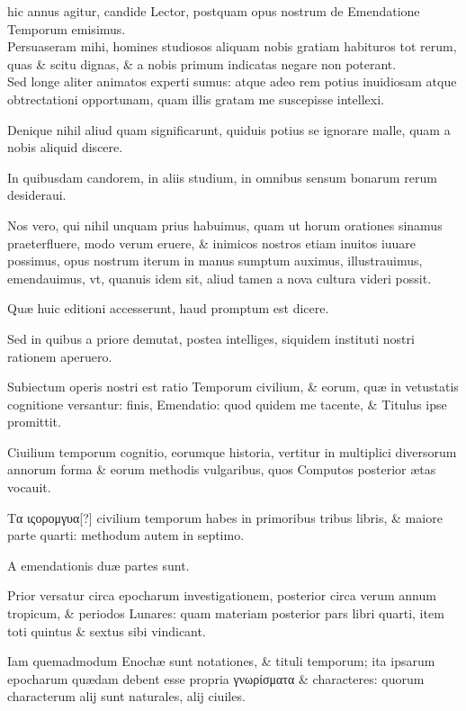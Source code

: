 \begin{parnumbers}
 hic annus agitur, candide Lector, postquam opus nostrum de Emendatione Temporum emisimus.
\\ \p
Persuaseram mihi, homines studiosos aliquam nobis gratiam habituros tot rerum, quas \& scitu dignas, \& a nobis primum indicatas negare non poterant.
\\ \p
Sed longe aliter animatos experti sumus: atque adeo rem potius inuidiosam atque obtrectationi opportunam, quam illis gratam me suscepisse intellexi.

Denique nihil aliud quam significarunt, quiduis potius se ignorare malle, quam a nobis aliquid discere.

In quibusdam candorem, in aliis studium, in omnibus sensum bonarum rerum desideraui.

Nos vero, qui nihil unquam prius habuimus, quam ut horum orationes sinamus praeterfluere, modo verum eruere, \& inimicos nostros etiam inuitos iuuare possimus, opus nostrum iterum in manus sumptum auximus, illustrauimus, emendauimus, vt, quanuis idem sit, aliud tamen a nova cultura videri possit.

Quæ huic editioni accesserunt, haud promptum est dicere.

Sed in quibus a priore demutat, postea intelliges, siquidem instituti nostri rationem aperuero.

Subiectum operis nostri est ratio Temporum civilium, \& eorum, quæ in vetustatis cognitione versantur: finis, Emendatio: quod quidem me tacente, \& Titulus ipse promittit.

Ciuilium temporum cognitio, eorumque historia, vertitur in multiplici diversorum annorum forma \& eorum methodis vulgaribus, quos Computos posterior ætas vocauit.

\textgreek{Τα ιςορομγυα[?]} civilium temporum habes in primoribus tribus libris, \& maiore parte quarti: methodum autem in septimo.

A emendationis duæ partes sunt.

Prior versatur circa epocharum investigationem, posterior circa verum annum tropicum, 
\& periodos Lunares: quam materiam posterior pars libri quarti, item toti quintus \& sextus sibi vindicant.

Iam quemadmodum Enochæ sunt notationes, \& tituli temporum; ita ipsarum epocharum quædam debent esse propria \textgreek{γνωρίσματα} \& characteres: quorum characterum alij sunt naturales, alij ciuiles. 


\end{parnumbers}
